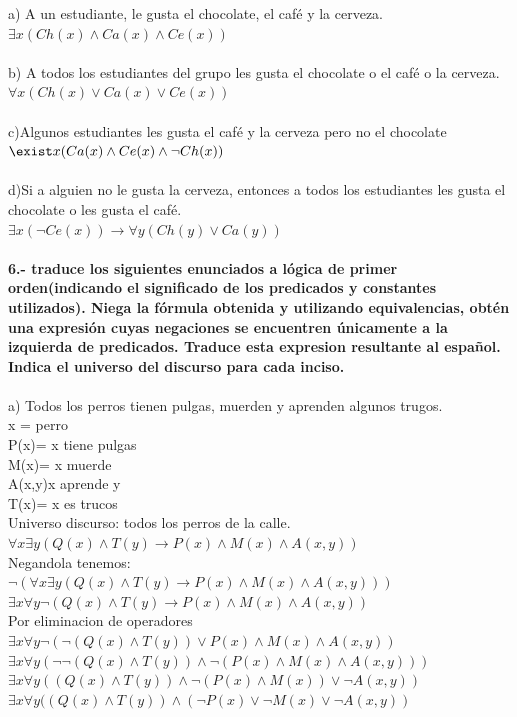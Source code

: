 \documentclass[paper=letter, fontsize=12pt]{scrartcl}
\begin{document}
a) A un estudiante, le gusta el chocolate, el café y la cerveza.\\
$\exists x(Ch(x) \wedge Ca(x) \wedge Ce(x))$\\ \\
b) A todos los estudiantes del grupo les gusta el chocolate o el café o la cerveza.\\
$\forall x(Ch(x)\vee Ca(x)\vee Ce(x))$\\ \\
c)Algunos estudiantes les gusta el café y la cerveza pero no el chocolate\\
$\exist x(Ca(x)\wedge Ce(x)\wedge \neg Ch(x))$\\ \\
d)Si a alguien no le gusta la cerveza, entonces a todos los estudiantes les gusta el chocolate o les gusta el café.\\
$\exists x(\neg Ce(x))\rightarrow \forall y(Ch(y)\vee Ca(y))$\\ \\
{\Large{\bf 6.- traduce los siguientes enunciados a lógica de primer orden(indicando el significado de los predicados y constantes utilizados). Niega la fórmula obtenida y utilizando equivalencias, obtén una expresión cuyas negaciones se encuentren únicamente a la izquierda de predicados. Traduce esta expresion resultante al español. Indica el universo del discurso para cada inciso.}}\\ \\
a) Todos los perros tienen pulgas, muerden y aprenden algunos trugos.\\
x = perro\\
P(x)= x tiene pulgas\\
M(x)= x muerde\\
A(x,y)x aprende y\\
T(x)= x es trucos\\
Universo discurso: todos los perros de la calle. \\
$\forall x\exists y(Q(x)\wedge T(y)\rightarrow P(x)\wedge M(x) \wedge A(x,y))$\\

Negandola tenemos:\\
$\neg (\forall x\exists y(Q(x)\wedge T(y)\rightarrow P(x)\wedge M(x) \wedge A(x,y))) $\\
$\exists x \forall y\neg(Q(x)\wedge T(y)\rightarrow P(x)\wedge M(x) \wedge A(x,y))$\\
Por eliminacion de operadores
$\exists x \forall y\neg(\neg(Q(x)\wedge T(y))\vee P(x)\wedge M(x) \wedge A(x,y))$\\
$\exists x \forall y(\neg\neg(Q(x)\wedge T(y))\wedge \neg(P(x)\wedge M(x) \wedge A(x,y)))$\\
$\exists x \forall y((Q(x)\wedge T(y))\wedge \neg(P(x)\wedge M(x)) \vee \neg A(x,y))$\\
$\exists x \forall y((Q(x)\wedge T(y))\wedge (\neg P(x)\vee \neg M(x) \vee \neg A(x,y))$\\
\end{document}
